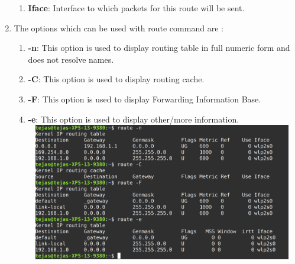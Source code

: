 \documentclass[a4paper,11pt]{article}
\begin{document}
\begin{enumerate}[itemsep=-3pt,label=(\alph*)]
\begin{enumerate}[itemsep=0pt,label=(\roman*)]
          \item \textbf{Iface}: Interface to which packets for this route will be sent.
          \end{enumerate}
      \item The options which can be used with route command are :\vspace{-2mm}
      \begin{enumerate}[itemsep=0pt,label=(\roman*)]
      	\item \textbf{-n}: This option is used to display routing table in full numeric form and does not resolve names.
      	\item \textbf{-C}: This option is used to display routing cache.
      	\item \textbf{-F}: This option is used to display Forwarding Information Base.
      	\item \textbf{-e}: This option is used to display other/more information.\\
      	\includegraphics[height=60mm,width=120mm]{route}
      \end{enumerate}
     
\end{enumerate}
\end{document}
